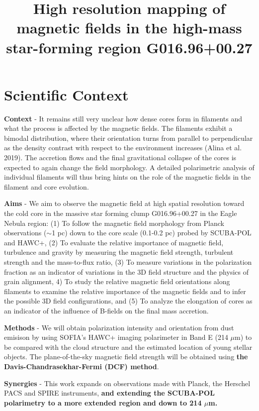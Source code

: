 \documentclass[11pt]{amsart}
\title{High resolution mapping of magnetic fields in the high-mass star-forming region G016.96+00.27}
\begin{document}
\maketitle


\section{Scientific Context}
{\bf Context} - It remains still very unclear how dense cores form in filaments and what the process is affected by the magnetic fields.
The filaments exhibit a bimodal distribution, where their orientation turns from parallel to perpendicular as the density contrast with respect to the environment increases  (Alina et al. 2019).
The accretion flows and the final gravitational collapse of the cores is expected to again change the field morphology. 
A detailed polarimetric analysis of individual filaments will thus bring hints on the role of the magnetic fields in the filament and core evolution.

{\bf Aims} - We aim to observe the magnetic field at high spatial resolution toward the 
cold core in the massive star forming clump G016.96+00.27 in the Eagle Nebula region:
(1) To follow the magnetic field morphology from Planck observations ($\sim$1 pc) down to the core scale (0.1-0.2 pc) probed by SCUBA-POL and HAWC+, 
(2) To evaluate the relative importance of magnetic field, turbulence and gravity by measuring the magnetic field strength, turbulent strength and the mass-to-flux ratio, 
(3) To measure variations in the polarization fraction 
as an indicator of variations in the 3D field structure and the physics of grain alignment,  
4) To study the relative magnetic field orientations along filaments to examine the relative importance of the magnetic fields and to infer the possible 3D field configurations,
and 
(5) To analyze the elongation of cores 
as an indicator of the influence of B-fields on the final mass accretion.

{\bf Methods} - 
We will obtain polarization intensity and orientation from dust emisison by using SOFIA's HAWC+ imaging polarimeter in Band E (214 $\mu$m) to be compared with the cloud structure and the 
estimated location of young stellar objects. The plane-of-the-sky magnetic field strength will be obtained using {\bf the Davis-Chandrasekhar-Fermi (DCF) method}. 

{\bf Synergies} - This work expands on observations made with Planck, the Herschel PACS and SPIRE instruments, {\bf and extending the SCUBA-POL polarimetry to a more extended region and down to 214 $\mu$m.} 
\end{document}
